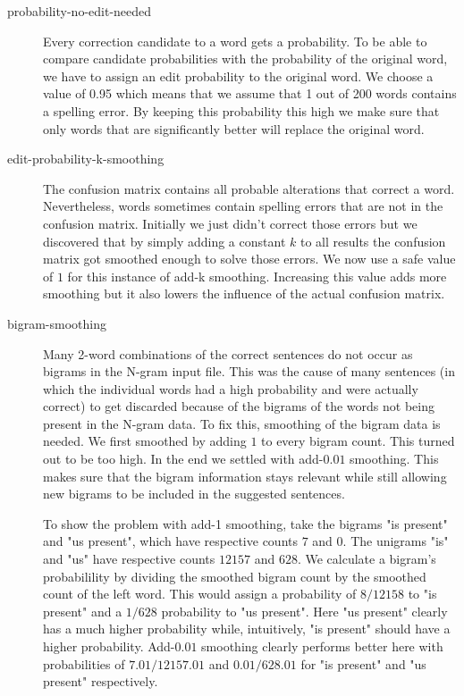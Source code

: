 \documentclass[11pt,a4paper]{article}
\begin{document}
\begin{description}
\item[probability-no-edit-needed] Every correction candidate to a word gets a probability. To be able to compare candidate probabilities with the probability of the original word, we have to assign an edit probability to the original word. We choose a value of 0.95 which means that we assume that 1 out of 200 words contains a spelling error. By keeping this probability this high we make sure that only words that are significantly better will replace the original word.

\item[edit-probability-k-smoothing] The confusion matrix contains all probable alterations that correct a word. Nevertheless, words sometimes contain spelling errors that are not in the confusion matrix. Initially we just didn't correct those errors but we discovered that by simply adding a constant $k$ to all results the confusion matrix got smoothed enough to solve those errors. We now use a safe value of $1$ for this instance of add-k smoothing. Increasing this value adds more smoothing but it also lowers the influence of the actual confusion matrix.

\item[bigram-smoothing] Many 2-word combinations of the correct sentences do not occur as bigrams in the N-gram input file. This was the cause of many sentences (in which the individual words had a high probability and were actually correct) to get discarded because of the bigrams of the words not being present in the N-gram data. To fix this, smoothing of the bigram data is needed. We first smoothed by adding $1$ to every bigram count. This turned out to be too high. In the end we settled with add-$0.01$ smoothing. This makes sure that the bigram information stays relevant while still allowing new bigrams to be included in the suggested sentences.

To show the problem with add-1 smoothing, take the bigrams "is present" and "us present", which have respective counts $7$ and $0$. The unigrams "is" and "us" have respective counts $12157$ and $628$. We calculate a bigram's probabilility by dividing the smoothed bigram count by the smoothed count of the left word. This would assign a probability of $8/12158$ to "is present" and a $1/628$ probability to "us present". Here "us present" clearly has a much higher probability while, intuitively, "is present" should have a higher probability. Add-$0.01$ smoothing clearly performs better here with probabilities of $7.01/12157.01$ and $0.01/628.01$ for "is present" and "us present" respectively.
\end{description}
\end{document}
